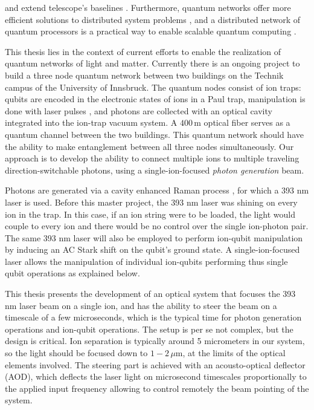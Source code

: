 \documentclass[english, a4paper, 12pt, twoside]{book}
\numberwithin{equation}{section} %
\begin{document}
and extend telescope's baselines \cite{telescope}. Furthermore, quantum networks offer more efficient solutions to distributed system problems \cite{distributedcomputing}, and a distributed network of quantum processors is a practical way to enable scalable quantum computing \cite{PhysRevA.89.022317}.\par
This thesis lies in the context of current efforts to enable the realization of quantum networks of light and matter. Currently there is an ongoing project to build a three node quantum network between two buildings on the Technik campus of the University of Innsbruck. The quantum nodes consist of ion traps: qubits are encoded in the electronic states of ions in a Paul trap, manipulation is done with laser pulses \cite{ionquantumcomputer}, and photons are collected with an optical cavity integrated into the ion-trap vacuum system. A $400\, \text{m}$ optical fiber serves as a quantum channel between the two buildings. This quantum network should have the ability to make entanglement between all three nodes simultaneously. Our approach is to develop the ability to connect multiple ions to multiple traveling direction-switchable photons, using a single-ion-focused \emph{photon generation} beam. \par
Photons are generated via a cavity enhanced Raman process \cite{stuteinterface}, for which a 393 nm laser is used. Before this master project, the 393 nm laser was shining on every ion in the trap. In this case, if an ion string were to be loaded, the light would couple to every ion and there would be no control over the single ion-photon pair. The same 393 nm laser will also be employed to perform ion-qubit manipulation by inducing an AC Stark shift on the qubit's ground state. A single-ion-focused laser allows the manipulation of individual ion-qubits performing thus single qubit operations as explained below.\par
This thesis presents the development of an optical system that focuses the 393 nm laser beam on a single ion, and has the ability to steer the beam on a timescale of a few microseconds, which is the typical time for photon generation operations and ion-qubit operations. The setup is per se not complex, but the design is critical. Ion separation is typically around 5 micrometers in our system, so the light should be focused down to $1-2\,\mu$m, at the limits of the optical elements involved. The steering part is achieved with an acousto-optical deflector (AOD), which deflects the laser light on microsecond timescales proportionally to the applied input frequency allowing to control remotely the beam pointing of the system.
\end{document}
